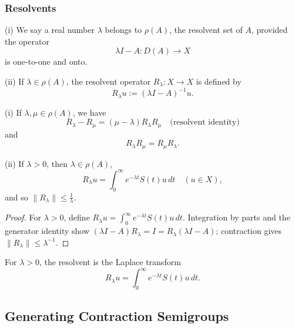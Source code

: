 \subsubsection{Resolvents}

\begin{definition}
\label{def:resolvent-set-operator}
(i) We say a real number $\lambda$ belongs to $\rho(A)$, the resolvent set of $A$, provided the operator
\[
\lambda I - A : D(A) \to X
\]
is one-to-one and onto.

(ii) If $\lambda \in \rho(A)$, the resolvent operator $R_\lambda : X \to X$ is defined by
\[
R_\lambda u := (\lambda I - A)^{-1}u.
\]
\end{definition}

\begin{theorem}
\label{thm:resolvent-operator-properties}
(i) If $\lambda, \mu \in \rho(A)$, we have
\[
R_\lambda - R_\mu = (\mu - \lambda)R_\lambda R_\mu \quad \text{(resolvent identity)}
\tag{12}
\]
and
\[
R_\lambda R_\mu = R_\mu R_\lambda.
\tag{13}
\]

(ii) If $\lambda > 0$, then $\lambda \in \rho(A)$,
\[
R_\lambda u = \int_0^\infty e^{-\lambda t}S(t)u \, dt \quad (u \in X),
\tag{14}
\]
and so $\|R_\lambda\| \leq \frac{1}{\lambda}$.
\end{theorem}

\begin{proof}
\sketch For $\lambda>0$, define $R_\lambda u=\int_0^\infty e^{-\lambda t}S(t)u\,dt$. Integration by parts and the generator identity show $(\lambda I-A)R_\lambda=I=R_\lambda(\lambda I-A)$; contraction gives $\|R_\lambda\|\le\lambda^{-1}$.
\end{proof}

\begin{remark}
\label{rem:resolvent-laplace-transform-semigroup}
For $\lambda>0$, the resolvent is the Laplace transform
\[
R_\lambda u=\int_0^\infty e^{-\lambda t}S(t)u\,dt.
\]
\end{remark}

\subsection{Generating Contraction Semigroups}
\label{sec:generating-contraction-semigroups}

